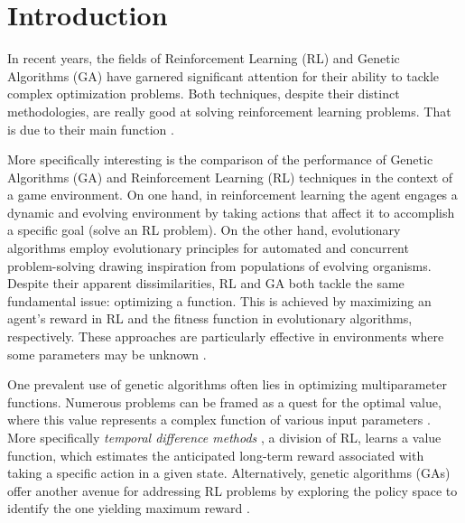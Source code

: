 \section{Introduction}

In recent years, the fields of Reinforcement Learning (RL) and Genetic Algorithms (GA) have garnered significant attention for their ability to tackle complex optimization problems. 
Both techniques, despite their distinct methodologies, are really good at solving reinforcement learning problems. 
That is due to their main function  \cite{taylor2006comparing}. 


More specifically interesting is the comparison of the performance of Genetic Algorithms (GA) and Reinforcement Learning (RL) techniques in the context of a game environment. 
On one hand, in reinforcement learning the agent engages a dynamic and evolving environment by taking actions that affect it to accomplish a specific goal (solve an RL problem). 
On the other hand, evolutionary algorithms employ evolutionary principles for automated and concurrent problem-solving drawing inspiration from populations of evolving organisms. 
Despite their apparent dissimilarities, RL and GA both tackle the same fundamental issue: optimizing a function. 
This is achieved by maximizing an agent's reward in RL and the fitness function in evolutionary algorithms, respectively. 
These approaches are particularly effective in environments where some parameters may be unknown \cite{drugan2019reinforcement}.  

 One prevalent use of genetic algorithms often lies in optimizing multiparameter functions. 
 Numerous problems can be framed as a quest for the optimal value, where this value represents a complex function of various input parameters \cite{forrest1996genetic}. 
 More specifically \textit{temporal difference methods} , a division of RL,  learns a value function, which estimates the anticipated long-term reward associated with taking a specific action in a given state. 
 Alternatively, genetic algorithms (GAs) offer another avenue for addressing RL problems by exploring the policy space to identify the one yielding maximum reward \cite{taylor2006comparing}. 

